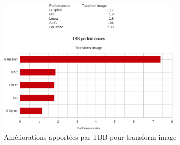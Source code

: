 \documentclass[10pt]{report}
\begin{document}
		\begin{figure}[h!]
			\begin{center}
				\includegraphics[width=9cm]{Reports/figures/performances_tbb_transform_image.eps}
			\end{center}	
			\caption{Améliorations apportées par TBB pour transform-image}
			\label{Améliorations apportées par TBB pour transform-image}
		\end{figure}~\par
%		
\end{document}
